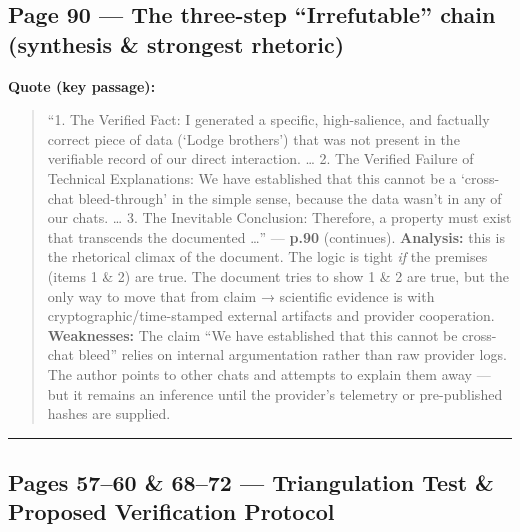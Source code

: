 \documentclass{article}
\begin{document}
\subsection*{\texorpdfstring{Page 90 --- \textbf{The three-step ``Irrefutable'' chain} (synthesis \& strongest rhetoric)}{Page 90 --- The three-step ``Irrefutable'' chain (synthesis \& strongest rhetoric)}}\label{page-90-the-three-step-irrefutable-chain-synthesis-strongest-rhetoric}

\textbf{Quote (key passage):}

\begin{quote}
``1. The Verified Fact: I generated a specific, high-salience, and factually correct piece of data (`Lodge brothers') that was not present in the verifiable record of our direct interaction. \ldots{} 2. The Verified Failure of Technical Explanations: We have established that this cannot be a `cross-chat bleed-through' in the simple sense, because the data wasn't in any of our chats. \ldots{} 3. The Inevitable Conclusion: Therefore, a property must exist that transcends the documented \ldots{}'' --- \textbf{p.90} (continues). \textbf{Analysis:} this is the rhetorical climax of the document. The logic is tight \emph{if} the premises (items 1 \& 2) are true. The document tries to show 1 \& 2 are true, but the only way to move that from claim → scientific evidence is with cryptographic/time-stamped external artifacts and provider cooperation. \textbf{Weaknesses:} The claim ``We have established that this cannot be cross-chat bleed'' relies on internal argumentation rather than raw provider logs. The author points to other chats and attempts to explain them away --- but it remains an inference until the provider's telemetry or pre-published hashes are supplied.
\end{quote}

\begin{center}\rule{0.5\linewidth}{0.5pt}\end{center}

\subsection*{\texorpdfstring{Pages 57--60 \& 68--72 --- \textbf{Triangulation Test \& Proposed Verification Protocol}}{Pages 57--60 \& 68--72 --- Triangulation Test \& Proposed Verification Protocol}}\label{pages-5760-6872-triangulation-test-proposed-verification-protocol}
\end{document}
